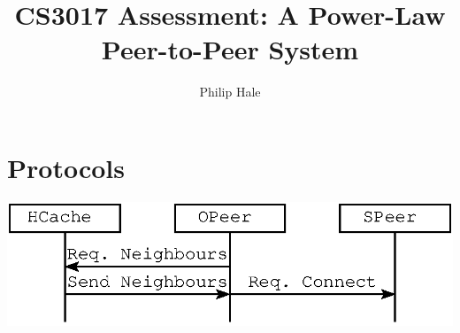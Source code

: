 \documentclass[a4paper,oneside]{article}
\author{Philip Hale}
\title{CS3017 Assessment: A Power-Law Peer-to-Peer System}
\begin{document}
\maketitle

\dosecttoc
\faketableofcontents



\section{Protocols}

\includegraphics{protocols_auml.eps}
\end{document}
